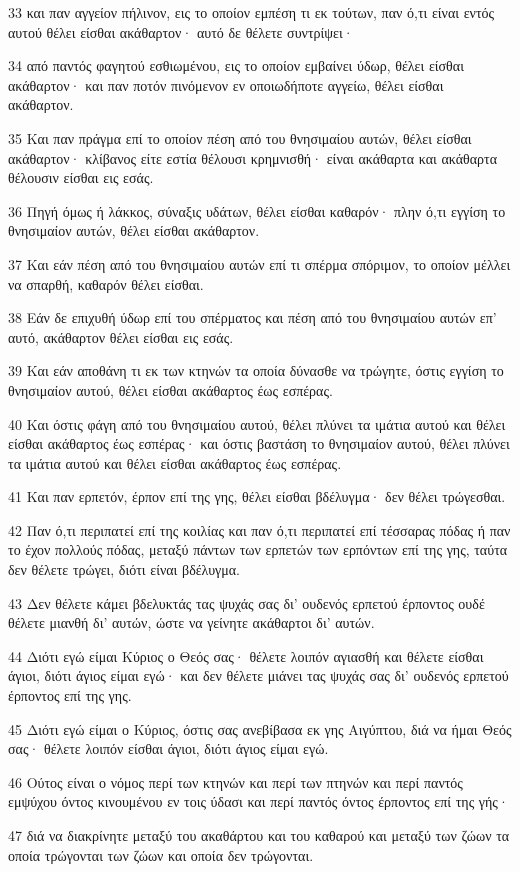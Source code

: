 \par 33 και παν αγγείον πήλινον, εις το οποίον εμπέση τι εκ τούτων, παν ό,τι είναι εντός αυτού θέλει είσθαι ακάθαρτον· αυτό δε θέλετε συντρίψει·
\par 34 από παντός φαγητού εσθιωμένου, εις το οποίον εμβαίνει ύδωρ, θέλει είσθαι ακάθαρτον· και παν ποτόν πινόμενον εν οποιωδήποτε αγγείω, θέλει είσθαι ακάθαρτον.
\par 35 Και παν πράγμα επί το οποίον πέση από του θνησιμαίου αυτών, θέλει είσθαι ακάθαρτον· κλίβανος είτε εστία θέλουσι κρημνισθή· είναι ακάθαρτα και ακάθαρτα θέλουσιν είσθαι εις εσάς.
\par 36 Πηγή όμως ή λάκκος, σύναξις υδάτων, θέλει είσθαι καθαρόν· πλην ό,τι εγγίση το θνησιμαίον αυτών, θέλει είσθαι ακάθαρτον.
\par 37 Και εάν πέση από του θνησιμαίου αυτών επί τι σπέρμα σπόριμον, το οποίον μέλλει να σπαρθή, καθαρόν θέλει είσθαι.
\par 38 Εάν δε επιχυθή ύδωρ επί του σπέρματος και πέση από του θνησιμαίου αυτών επ' αυτό, ακάθαρτον θέλει είσθαι εις εσάς.
\par 39 Και εάν αποθάνη τι εκ των κτηνών τα οποία δύνασθε να τρώγητε, όστις εγγίση το θνησιμαίον αυτού, θέλει είσθαι ακάθαρτος έως εσπέρας.
\par 40 Και όστις φάγη από του θνησιμαίου αυτού, θέλει πλύνει τα ιμάτια αυτού και θέλει είσθαι ακάθαρτος έως εσπέρας· και όστις βαστάση το θνησιμαίον αυτού, θέλει πλύνει τα ιμάτια αυτού και θέλει είσθαι ακάθαρτος έως εσπέρας.
\par 41 Και παν ερπετόν, έρπον επί της γης, θέλει είσθαι βδέλυγμα· δεν θέλει τρώγεσθαι.
\par 42 Παν ό,τι περιπατεί επί της κοιλίας και παν ό,τι περιπατεί επί τέσσαρας πόδας ή παν το έχον πολλούς πόδας, μεταξύ πάντων των ερπετών των ερπόντων επί της γης, ταύτα δεν θέλετε τρώγει, διότι είναι βδέλυγμα.
\par 43 Δεν θέλετε κάμει βδελυκτάς τας ψυχάς σας δι' ουδενός ερπετού έρποντος ουδέ θέλετε μιανθή δι' αυτών, ώστε να γείνητε ακάθαρτοι δι' αυτών.
\par 44 Διότι εγώ είμαι Κύριος ο Θεός σας· θέλετε λοιπόν αγιασθή και θέλετε είσθαι άγιοι, διότι άγιος είμαι εγώ· και δεν θέλετε μιάνει τας ψυχάς σας δι' ουδενός ερπετού έρποντος επί της γης.
\par 45 Διότι εγώ είμαι ο Κύριος, όστις σας ανεβίβασα εκ γης Αιγύπτου, διά να ήμαι Θεός σας· θέλετε λοιπόν είσθαι άγιοι, διότι άγιος είμαι εγώ.
\par 46 Ούτος είναι ο νόμος περί των κτηνών και περί των πτηνών και περί παντός εμψύχου όντος κινουμένου εν τοις ύδασι και περί παντός όντος έρποντος επί της γής·
\par 47 διά να διακρίνητε μεταξύ του ακαθάρτου και του καθαρού και μεταξύ των ζώων τα οποία τρώγονται των ζώων και οποία δεν τρώγονται.

